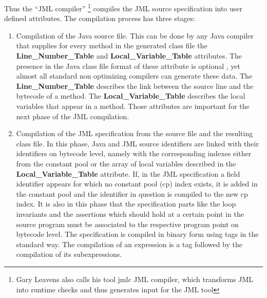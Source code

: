 Thus the ``JML compiler'' \footnote{Gary Leavens also calls his tool jmlc JML compiler, which transforms JML into runtime checks and thus generates input for the JML tool  } compiles the JML source specification into user defined attributes. The compilation process has three stages:
\begin{enumerate}
\item Compilation of the Java source file. This can be done by any Java compiler that supplies for every method in the generated class file 
the \\ \textbf{Line\_Number\_Table} and \textbf{Local\_Variable\_Table}  attributes. The presence in the Java class file format of 
these attribute is optional \cite{VMSpec}, yet almost all standard non optimizing compilers can generate these data. 
The \textbf{Line\_Number\_Table} describes the link between the source line and the bytecode of a method.  
The \textbf{Local\_Variable\_Table} describes the local variables that appear in a method. 
Those attributes are important for the next phase of the JML compilation.
\item Compilation of the JML specification from the source file and the resulting class file. In this phase, Java and JML source identifiers are 
linked with their identifiers on bytecode level, namely with the corresponding indexes either from the constant pool or the array of 
local variables described in the \textbf{Local\_Variable\_Table} attribute. If, in the JML specification a field
identifier appears for which no constant pool (cp) index exists, it is added in the constant pool and the identifier in question
is compiled to the new cp index. It is also in this phase that the specification parts like the loop invariants and the assertions which should hold at a certain point in the source program must be associated to the respective program point on bytecode level. The specification
is compiled in binary form using tags in the standard way. The compilation of an expression is a tag followed by the compilation of its subexpressions. 



\end{enumerate}
